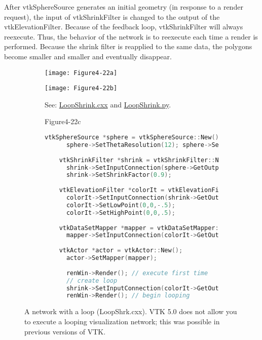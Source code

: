 After vtkSphereSource generates an initial geometry (in response to a render request), the input of vtkShrinkFilter is changed to the output of the vtkElevationFilter. Because of the feedback loop, vtkShrinkFilter will always reexecute. Thus, the behavior of the network is to reexecute each time a render is performed. Because the shrink filter is reapplied to the same data, the polygons become smaller and smaller and eventually disappear.

\begin{figure}[htb]
  \begin{subfigure}[h]{0.48\linewidth}
    \texttt{[image: Figure4-22a]}
    \caption*{}
    \label{fig:Figure4-22a}
  \end{subfigure}
  \hfill
  \begin{subfigure}[h]{0.48\linewidth}
    \texttt{[image: Figure4-22b]}
    \caption*{See: \href{https://lorensen.github.io/VTKExamples/site/Cxx/Visualization/LoopShrink/}{LoopShrink.cxx} and \href{https://lorensen.github.io/VTKExamples/site/Python/Visualization/LoopShrink/}{LoopShrink.py}.}
    \label{fig:Figure4-22b}
  \end{subfigure}
  \hfill
  \begin{subfigure}[h]{0.96\linewidth}{Figure4-22c}
    \begin{lstlisting}[language=C++, caption={Warped Sphere.}]
    vtkSphereSource *sphere = vtkSphereSource::New();
      sphere->SetThetaResolution(12); sphere->SetPhiResolution(12);
    
    vtkShrinkFilter *shrink = vtkShrinkFilter::New();
      shrink->SetInputConnection(sphere->GetOutputPort());
      shrink->SetShrinkFactor(0.9);
    
    vtkElevationFilter *colorIt = vtkElevationFilter::New();
      colorIt->SetInputConnection(shrink->GetOutputPort());
      colorIt->SetLowPoint(0,0,-.5);
      colorIt->SetHighPoint(0,0,.5);
    
    vtkDataSetMapper *mapper = vtkDataSetMapper::New();
      mapper->SetInputConnection(colorIt->GetOutputPort());
    
    vtkActor *actor = vtkActor::New();
      actor->SetMapper(mapper);
    
      renWin->Render(); // execute first time
      // create loop
      shrink->SetInputConnection(colorIt->GetOutputPort());
      renWin->Render(); // begin looping
    \end{lstlisting}
    \caption*{}
  \end{subfigure}
  \caption{A network with a loop (LoopShrk.cxx). VTK 5.0 does not allow you to execute a looping visualization network; this was possible in previous versions of VTK.}\label{fig:Figure4-22}
\end{figure}

